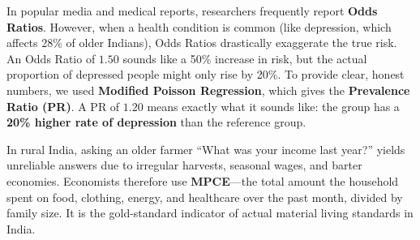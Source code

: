 \begin{description}[leftmargin=0.5cm, style=nextline]
    \item[\textbf{1. Prevalence Ratio (PR) vs. Odds Ratio (OR):}]
    In popular media and medical reports, researchers frequently report \textbf{Odds Ratios}. However, when a health condition is common (like depression, which affects 28\% of older Indians), Odds Ratios drastically exaggerate the true risk. An Odds Ratio of $1.50$ sounds like a 50\% increase in risk, but the actual proportion of depressed people might only rise by 20\%. To provide clear, honest numbers, we used \textbf{Modified Poisson Regression}, which gives the \textbf{Prevalence Ratio (PR)}. A PR of $1.20$ means exactly what it sounds like: the group has a \textbf{20\% higher rate of depression} than the reference group.

    \item[\textbf{2. Monthly Per Capita Consumption Expenditure (MPCE):}]
    In rural India, asking an older farmer ``What was your income last year?'' yields unreliable answers due to irregular harvests, seasonal wages, and barter economies. Economists therefore use \textbf{MPCE}—the total amount the household spent on food, clothing, energy, and healthcare over the past month, divided by family size. It is the gold-standard indicator of actual material living standards in India.
\end{description}
